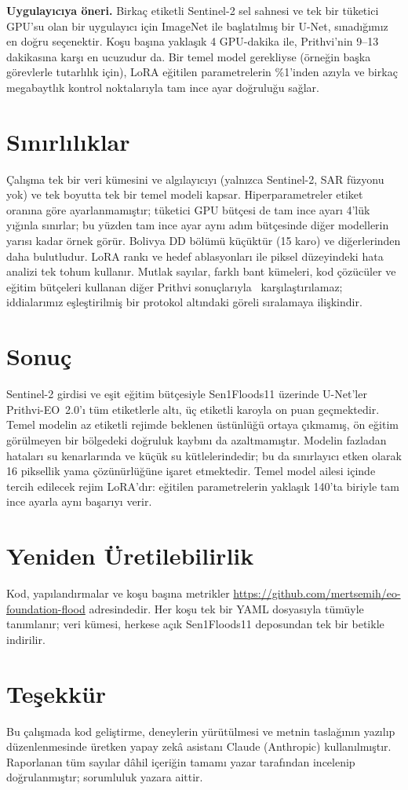 \documentclass[conference]{IEEEtran}
\begin{document}
\textbf{Uygulayıcıya öneri.} Birkaç etiketli Sentinel-2 sel sahnesi ve tek bir tüketici GPU'su olan bir uygulayıcı için ImageNet ile başlatılmış bir U-Net, sınadığımız en doğru seçenektir. Koşu başına yaklaşık 4 GPU-dakika ile, Prithvi'nin 9--13 dakikasına karşı en ucuzudur da. Bir temel model gerekliyse (örneğin başka görevlerle tutarlılık için), LoRA eğitilen parametrelerin \%1'inden azıyla ve birkaç megabaytlık kontrol noktalarıyla tam ince ayar doğruluğu sağlar.

\section{Sınırlılıklar}
Çalışma tek bir veri kümesini ve algılayıcıyı (yalnızca Sentinel-2, SAR füzyonu yok) ve tek boyutta tek bir temel modeli kapsar. Hiperparametreler etiket oranına göre ayarlanmamıştır; tüketici GPU bütçesi de tam ince ayarı 4'lük yığınla sınırlar; bu yüzden tam ince ayar aynı adım bütçesinde diğer modellerin yarısı kadar örnek görür. Bolivya DD bölümü küçüktür (15 karo) ve diğerlerinden daha bulutludur. LoRA rankı ve hedef ablasyonları ile piksel düzeyindeki hata analizi tek tohum kullanır. Mutlak sayılar, farklı bant kümeleri, kod çözücüler ve eğitim bütçeleri kullanan diğer Prithvi sonuçlarıyla~\cite{szwarcman2024prithvi} karşılaştırılamaz; iddialarımız eşleştirilmiş bir protokol altındaki göreli sıralamaya ilişkindir.

\section{Sonuç}
Sentinel-2 girdisi ve eşit eğitim bütçesiyle Sen1Floods11 üzerinde U-Net'ler Prithvi-EO~2.0'ı tüm etiketlerle altı, üç etiketli karoyla on puan geçmektedir. Temel modelin az etiketli rejimde beklenen üstünlüğü ortaya çıkmamış, ön eğitim görülmeyen bir bölgedeki doğruluk kaybını da azaltmamıştır. Modelin fazladan hataları su kenarlarında ve küçük su kütlelerindedir; bu da sınırlayıcı etken olarak 16 piksellik yama çözünürlüğüne işaret etmektedir. Temel model ailesi içinde tercih edilecek rejim LoRA'dır: eğitilen parametrelerin yaklaşık 140'ta biriyle tam ince ayarla aynı başarıyı verir.

\section*{Yeniden Üretilebilirlik}
Kod, yapılandırmalar ve koşu başına metrikler \url{https://github.com/mertsemih/eo-foundation-flood} adresindedir. Her koşu tek bir YAML dosyasıyla tümüyle tanımlanır; veri kümesi, herkese açık Sen1Floods11 deposundan tek bir betikle indirilir.

\section*{Teşekkür}
Bu çalışmada kod geliştirme, deneylerin yürütülmesi ve metnin taslağının yazılıp düzenlenmesinde üretken yapay zekâ asistanı Claude (Anthropic) kullanılmıştır. Raporlanan tüm sayılar dâhil içeriğin tamamı yazar tarafından incelenip doğrulanmıştır; sorumluluk yazara aittir.



\end{document}
